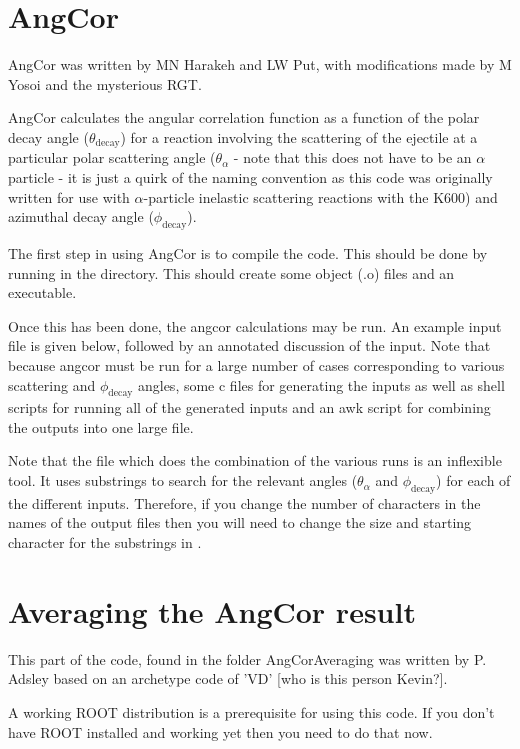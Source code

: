 \documentclass[a4paper,10pt]{article}
\begin{document}
\section{AngCor}

AngCor was written by MN Harakeh and LW Put, with modifications made by M Yosoi and the mysterious RGT.

AngCor calculates the angular correlation function as a function of the polar decay angle ($\theta_{\mathrm{decay}}$) for a reaction involving the scattering of the ejectile at a particular polar scattering angle ($\theta_{\alpha}$ - note that this does not have to be an $\alpha$ particle - it is just a quirk of the naming convention as this code was originally written for use with $\alpha$-particle inelastic scattering reactions with the K600) and azimuthal decay angle ($\phi_{\mathrm{decay}}$).

The first step in using AngCor is to compile the code. This should be done by running  in the  directory. This should create some object (.o) files and an  executable.

Once this has been done, the angcor calculations may be run. An example input file is given below, followed by an annotated discussion of the input. Note that because angcor must be run for a large number of cases corresponding to various scattering and $\phi_\mathrm{decay}$ angles, some c files for generating the inputs as well as shell scripts for running all of the generated inputs and an awk script for combining the outputs into one large file.

Note that the  file which does the combination of the various runs is an inflexible tool. It uses substrings to search for the relevant angles ($\theta_\alpha$ and $\phi_\mathrm{decay}$) for each of the different inputs. Therefore, if you change the number of characters in the names of the output files then you will need to change the size and starting character for the substrings in .

\section{Averaging the AngCor result}

This part of the code, found in the folder AngCorAveraging was written by P. Adsley based on an archetype code of 'VD' [who is this person Kevin?].

A working ROOT distribution is a prerequisite for using this code. If you don't have ROOT installed and working yet then you need to do that now.
\end{document}
